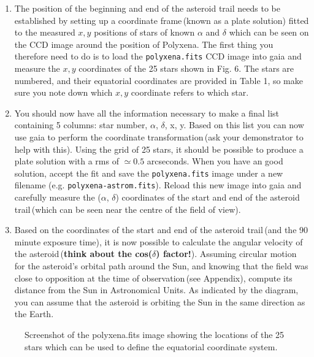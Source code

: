 \begin{enumerate}

\item The position of the beginning and end of the asteroid trail needs to be established by setting up a coordinate frame\,(known as a plate solution) fitted to the measured $x,y$ positions of stars of known $\alpha$ and $\delta$ which can be seen on the CCD image around the position of Polyxena. The first thing you therefore need to do is to load the {\tt polyxena.fits} CCD image into {\sc gaia} and measure the $x,y$ coordinates of the 25 stars shown in Fig. 6. The stars are numbered, and their equatorial coordinates are provided in Table 1, so make sure you note down which $x,y$ coordinate refers to which star. 

\item You should now have all the information necessary to make a final list containing 5 columns: star number, $\alpha$, $\delta$, x, y. Based on this list you can now use {\sc gaia} to perform the coordinate transformation\,(ask your demonstrator to help with this). Using the grid of 25 stars, it should be possible to produce a plate solution with a rms of $\simeq 0.5$ arcseconds. When you have an good solution, accept the fit and save the {\tt polyxena.fits} image under a new filename (e.g. {\tt polyxena-astrom.fits}). Reload this new image into {\sc gaia} and carefully measure the ($\alpha$, $\delta$) coordinates of the start and end of the asteroid trail\,(which can be seen near the centre of the field of view).

\item Based on the coordinates of the start and end of the asteroid trail\,(and the 90 minute exposure time), it is now possible to calculate the angular velocity of the asteroid\,({\bf think about the cos($\delta$) factor!}). Assuming circular motion for the asteroid's orbital path around the Sun, and knowing that the field was close to opposition at the time of observation\,(see Appendix), compute its distance from the Sun in Astronomical Units. As indicated by the diagram, you can assume that
the asteroid is orbiting the Sun in the same direction as the Earth.

\end{enumerate}

\newpage

\begin{figure}
\centerline{}
\caption{Screenshot of the polyxena.fits image showing the locations of the 25 stars which can be used to define the equatorial coordinate system.}
\end{figure}

